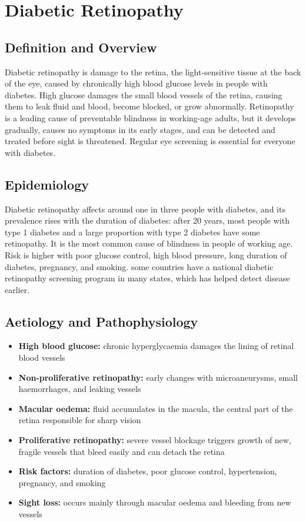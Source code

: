 \chapter{Diabetic Retinopathy}

\section*{Definition and Overview}
Diabetic retinopathy is damage to the retina, the light-sensitive tissue at the back of the eye, caused by chronically high blood glucose levels in people with diabetes. High glucose damages the small blood vessels of the retina, causing them to leak fluid and blood, become blocked, or grow abnormally. Retinopathy is a leading cause of preventable blindness in working-age adults, but it develops gradually, causes no symptoms in its early stages, and can be detected and treated before sight is threatened. Regular eye screening is essential for everyone with diabetes.

\section*{Epidemiology}
Diabetic retinopathy affects around one in three people with diabetes, and its prevalence rises with the duration of diabetes: after 20 years, most people with type 1 diabetes and a large proportion with type 2 diabetes have some retinopathy. It is the most common cause of blindness in people of working age. Risk is higher with poor glucose control, high blood pressure, long duration of diabetes, pregnancy, and smoking. some countries have a national diabetic retinopathy screening program in many states, which has helped detect disease earlier.

\section*{Aetiology and Pathophysiology}
\begin{itemize}
    \item \textbf{High blood glucose:} chronic hyperglycaemia damages the lining of retinal blood vessels
    \item \textbf{Non-proliferative retinopathy:} early changes with microaneurysms, small haemorrhages, and leaking vessels
    \item \textbf{Macular oedema:} fluid accumulates in the macula, the central part of the retina responsible for sharp vision
    \item \textbf{Proliferative retinopathy:} severe vessel blockage triggers growth of new, fragile vessels that bleed easily and can detach the retina
    \item \textbf{Risk factors:} duration of diabetes, poor glucose control, hypertension, pregnancy, and smoking
    \item \textbf{Sight loss:} occurs mainly through macular oedema and bleeding from new vessels
\end{itemize}

